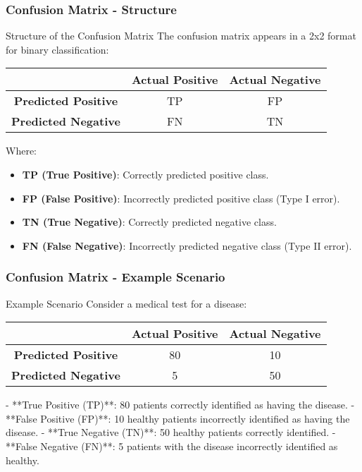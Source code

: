 \documentclass[aspectratio=169]{beamer}
\begin{document}
\begin{frame}[fragile]
    \frametitle{Confusion Matrix - Structure}
    \begin{block}{Structure of the Confusion Matrix}
        The confusion matrix appears in a 2x2 format for binary classification:

        \begin{center}
            \begin{tabular}{c|c|c}
                & \textbf{Actual Positive} & \textbf{Actual Negative} \\
                \hline
                \textbf{Predicted Positive} & TP & FP \\
                \hline
                \textbf{Predicted Negative} & FN & TN \\
            \end{tabular}
        \end{center}
        Where:
        \begin{itemize}
            \item \textbf{TP (True Positive)}: Correctly predicted positive class.
            \item \textbf{FP (False Positive)}: Incorrectly predicted positive class (Type I error).
            \item \textbf{TN (True Negative)}: Correctly predicted negative class.
            \item \textbf{FN (False Negative)}: Incorrectly predicted negative class (Type II error).
        \end{itemize}
    \end{block}
\end{frame}

\begin{frame}[fragile]
    \frametitle{Confusion Matrix - Example Scenario}
    \begin{block}{Example Scenario}
        Consider a medical test for a disease:

        \begin{center}
            \begin{tabular}{c|c|c}
                & \textbf{Actual Positive} & \textbf{Actual Negative} \\
                \hline
                \textbf{Predicted Positive} & 80 & 10 \\
                \hline
                \textbf{Predicted Negative} & 5 & 50 \\
            \end{tabular}
        \end{center}

        - **True Positive (TP)**: 80 patients correctly identified as having the disease.
        - **False Positive (FP)**: 10 healthy patients incorrectly identified as having the disease.
        - **True Negative (TN)**: 50 healthy patients correctly identified.
        - **False Negative (FN)**: 5 patients with the disease incorrectly identified as healthy.
    \end{block}
\end{frame}
\end{document}
